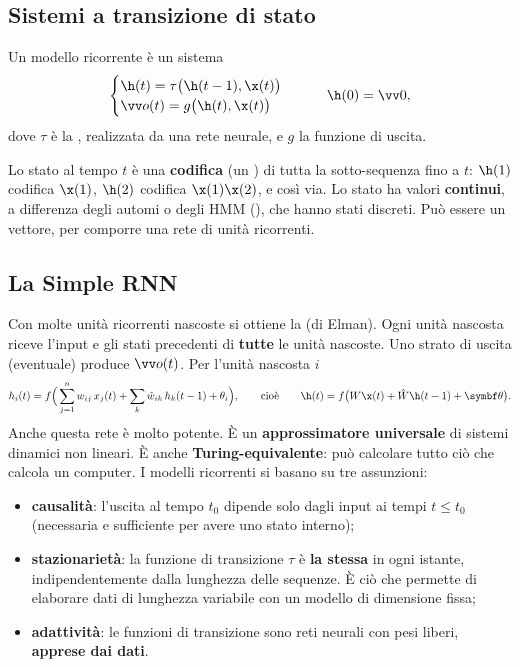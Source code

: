 \subsection{Sistemi a transizione di stato}

\begin{definizione}
Un modello ricorrente è un sistema
\[
\begin{cases}\h(t) = \tau\big(\h(t-1),\x(t)\big)\\ \vv o(t) = g\big(\h(t),\x(t)\big)\end{cases}\qquad \h(0) = \vv0,
\]
dove $\tau$ è la , realizzata da una rete neurale, e $g$ la funzione di uscita.
\end{definizione}

Lo stato al tempo $t$ è una \textbf{codifica} (un ) di tutta la sotto-sequenza fino a $t$: $\h(1)$
codifica $\x(1)$, $\h(2)$ codifica $\x(1)\x(2)$, e così via. Lo stato ha valori \textbf{continui}, a differenza
degli automi o degli HMM (), che hanno stati discreti. Può essere un vettore, per comporre
una rete di unità ricorrenti.

\subsection{La Simple RNN}

Con molte unità ricorrenti nascoste si ottiene la  (di Elman). Ogni unità nascosta riceve
l'input e gli stati precedenti di \textbf{tutte} le unità nascoste. Uno strato di uscita (eventuale) produce
$\vv o(t)$. Per l'unità nascosta $i$
\[
h_i(t) = f\Big(\sum_{j=1}^{n}w_{ij}\,x_j(t) + \sum_k\hat w_{ik}\,h_k(t-1) + \theta_i\Big),
\qquad\text{cioè}\qquad \h(t) = f\big(W\x(t) + \hat W\h(t-1) + \symbf\theta\big).
\]
Anche questa rete è molto potente. È un \textbf{approssimatore universale} di sistemi dinamici non lineari. È anche
\textbf{Turing-equivalente}: può calcolare tutto ciò che calcola un computer. I modelli ricorrenti si basano su tre
assunzioni:
\begin{itemize}
  \item \textbf{causalità}: l'uscita al tempo $t_0$ dipende solo dagli input ai tempi $t\le t_0$ (necessaria e
        sufficiente per avere uno stato interno);
  \item \textbf{stazionarietà}: la funzione di transizione $\tau$ è \textbf{la stessa} in ogni istante,
        indipendentemente dalla lunghezza delle sequenze. È ciò che permette di elaborare dati di lunghezza
        variabile con un modello di dimensione fissa;
  \item \textbf{adattività}: le funzioni di transizione sono reti neurali con pesi liberi, \textbf{apprese dai dati}.
\end{itemize}

